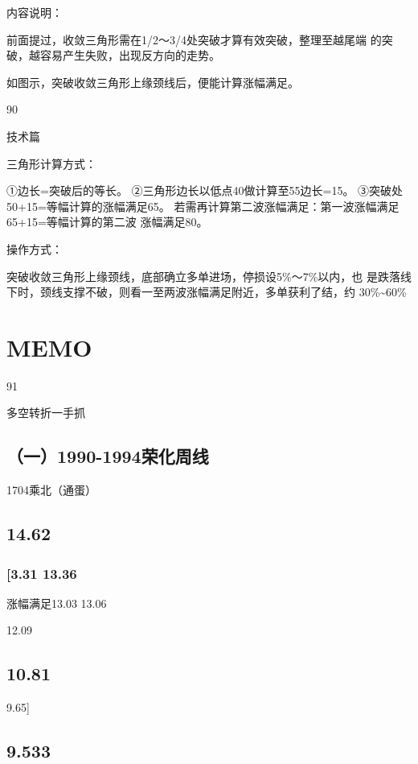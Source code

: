 \documentclass{article}
\begin{document}
内容说明：

前面提过，收敛三角形需在1/2～3/4处突破才算有效突破，整理至越尾端 的突破，越容易产生失败，出现反方向的走势。

如图示，突破收敛三角形上缘颈线后，便能计算涨幅满足。

90

\clearpage

技术篇

三角形计算方式：

①边长=突破后的等长。 ②三角形边长以低点40做计算至55边长=15。 ③突破处50+15=等幅计算的涨幅满足65。 若需再计算第二波涨幅满足：第一波涨幅满足65+15=等幅计算的第二波 涨幅满足80。

操作方式：

突破收敛三角形上缘颈线，底部确立多单进场，停损设5\%～7\%以内，也 是跌落线下时，颈线支撑不破，则看一至两波涨幅满足附近，多单获利了结，约 30\%\textasciitilde{}60\%

\section{MEMO}

91

\clearpage

多空转折一手抓

\subsection{（一）1990-1994荣化周线}

1704乘北（通蛋）

\subsection{14.62}

\subsubsection{[3.31 13.36}

涨幅满足13.03 13.06

12.09

\subsection{10.81}

9.65]

\subsection{9.533}
\end{document}
